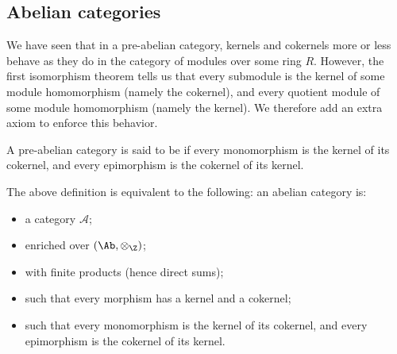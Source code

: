 \documentclass[main.tex]{subfiles}
\begin{document}
\subsection{Abelian categories}
\label{ssc:abelian_categories}

We have seen that in a pre-abelian category, kernels and cokernels more or less behave as they do in the category of modules over some ring $R$. However, the first isomorphism theorem tells us that every submodule is the kernel of some module homomorphism (namely the cokernel), and every quotient module of some module homomorphism (namely the kernel). We therefore add an extra axiom to enforce this behavior.

\begin{definition}
  \label{def:abelian_cateogry}
  A pre-abelian category is said to be  if every monomorphism is the kernel of its cokernel, and every epimorphism is the cokernel of its kernel.
\end{definition}

The above definition is equivalent to the following: an abelian category is:
\begin{itemize}
  \item a category \(\mathcal{A}\);

  \item enriched over \((\Ab, \otimes_{\Z})\);

  \item with finite products (hence direct sums);

  \item such that every morphism has a kernel and a cokernel;

  \item such that every monomorphism is the kernel of its cokernel, and every epimorphism is the cokernel of its kernel.
\end{itemize}
\end{document}
